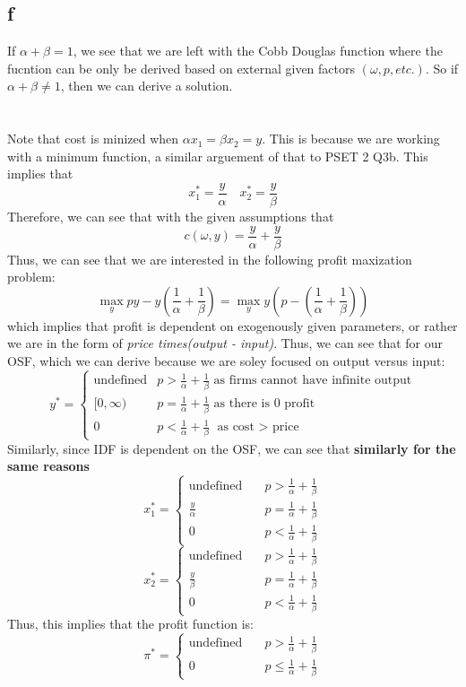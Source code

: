 \documentclass[11pt]{article}
\begin{document}
\subsection*{f}
If $\alpha + \beta = 1$, we see that we are left with the Cobb Douglas function where the fucntion can be only be derived based on external given factors $(\omega, p,  etc.)$. So if $\alpha + \beta \neq 1$, then we can derive a solution. 
\section{}
Note that cost is minized when $\alpha x_1  = \beta x_2 = y$. This is because we are working with a minimum function, a similar arguement of that to PSET 2 Q3b. This implies that 
\[
x_1^* = \frac{y}{\alpha} \quad x_2^* = \frac{y}{\beta}
\]
Therefore, we can see that with the given assumptions that 
\[
c(\omega, y) = \frac{y}{\alpha} + \frac{y}{\beta}
\]
Thus, we can see that we are interested in the following profit maxization problem:
\[
\max_y py - y\left(\frac{1}{\alpha} + \frac{1}{\beta}\right) = \max_y y \left( p - \left( \frac{1}{\alpha} + \frac{1}{\beta} \right) \right)
\]
which implies that profit is dependent on exogenously given parameters, or rather we are in the form of \emph{price times(output - input)}. Thus, we can see that for our OSF, which we can derive because we are soley focused on output versus input:
\[y^* = 
\begin{cases}
    \text{undefined} & p > \frac{1}{\alpha} + \frac{1}{\beta} \text{ as firms cannot have infinite output}\\
    [0, \infty) & p = \frac{1}{\alpha} + \frac{1}{\beta} \text{ as there is 0 profit}\\
    0 & p < \frac{1}{\alpha} + \frac{1}{\beta} \text{ as cost $>$ price}
\end{cases}
\]
Similarly, since IDF is dependent on the OSF, we can see that \textbf{similarly for the same reasons}
\[
x_1^* = \begin{cases}
    \text{undefined} &\quad p > \frac{1}{\alpha} + \frac{1}{\beta} \\
    \frac{y}{\alpha} &\quad p = \frac{1}{\alpha} + \frac{1}{\beta} \\
    0 &\quad p < \frac{1}{\alpha} + \frac{1}{\beta}
\end{cases}
\]
\[
x_2^* = \begin{cases}
    \text{undefined} &\quad p > \frac{1}{\alpha} + \frac{1}{\beta} \\
    \frac{y}{\beta}&\quad p = \frac{1}{\alpha} + \frac{1}{\beta} \\
    0 &\quad p < \frac{1}{\alpha} + \frac{1}{\beta}
\end{cases}
\] 
Thus, this implies that the profit function is:
\[
\pi^* = \begin{cases}
    \text{undefined} &\quad p > \frac{1}{\alpha} + \frac{1}{\beta} \\
    0 & \quad p \leq \frac{1}{\alpha} + \frac{1}{\beta}
\end{cases}
\]
\end{document}
